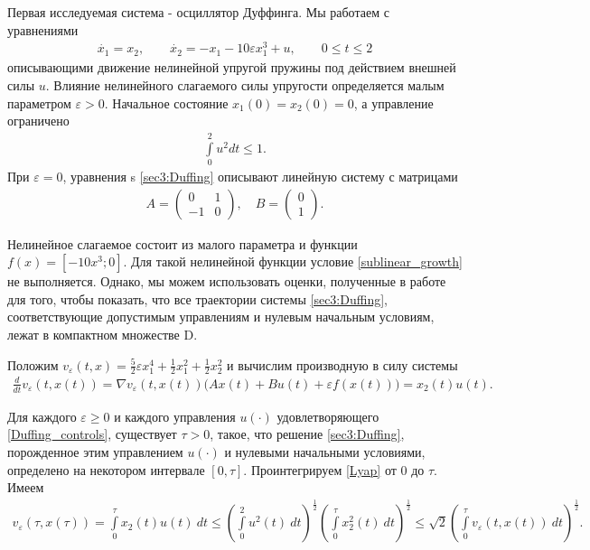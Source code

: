 \documentclass[../main.tex]{subfiles}
\begin{document}
\begin{pr}
	Первая исследуемая система - осциллятор Дуффинга. 
	Мы работаем с уравнениями
	\begin{gather}\label{sec3:Duffing}
		\dot{x_1} = x_2, \qquad
		\dot{x_2} = -x_1 - 10 \varepsilon x_1^3 + u ,\qquad 0\leqslant t  \leqslant 2
	\end{gather}
	описывающими движение нелинейной упругой пружины под действием внешней силы $u$. 
	Влияние нелинейного слагаемого силы упругости определяется малым параметром $\varepsilon > 0$. Начальное состояние $x_1(0) = x_2(0) = 0 $, а управление ограничено 
	\begin{gather}\label{Duffing_controls}
		\int\limits_0^2u^2dt \leqslant 1.
	\end{gather}
	При $\varepsilon = 0$, уравнения s \eqref{sec3:Duffing} описывают линейную систему с матрицами 
	\begin{gather*}
		A = \begin{pmatrix} 0 & 1\\
			-1 & 0
		\end{pmatrix}, \quad B = \begin{pmatrix}
			0\\
			1
		\end{pmatrix}.
	\end{gather*}
	
	Нелинейное слагаемое состоит из малого параметра и функции $f(x) = [-10x^3;0]$. 
	Для такой нелинейной функции условие  \eqref{sublinear_growth} не выполняется. 
	Однако, мы можем использовать оценки, полученные в работе  \cite{Zykov2019} для того, чтобы показать, что все траектории системы \eqref{sec3:Duffing}, соответствующие допустимым управлениям и нулевым начальным условиям, лежат в компактном множестве D. 
	
	Положим $v_{\varepsilon}(t,x) = \frac{5}{2}\varepsilon x_1^4 + \frac{1}{2}x_1^2 + \frac{1}{2}x_2^2$ и вычислим производную в силу системы 
	\begin{gather}\label{Lyap}
		\frac{d}{dt} v_{\varepsilon}(t,x(t)) = \nabla v_{\varepsilon}(t,x(t)) \big(A x(t) + B u(t) + \varepsilon f(x(t))\big) = x_2(t) u(t). 
	\end{gather} 
	
	Для каждого $\varepsilon \geqslant 0$ и каждого управления $u(\cdot)$ удовлетворяющего \eqref{Duffing_controls}, существует $\tau>0$, такое, что решение \eqref{sec3:Duffing}, порожденное этим управлением $u(\cdot)$ и нулевыми начальными условиями, определено на некотором интервале $[0, \tau]$. 
	Проинтегрируем \eqref{Lyap} от $0$ до $\tau$. 
	Имеем 
	\begin{gather*}
		v_{\varepsilon}(\tau,x(\tau)) =
		\int\limits_0^{\tau} x_2(t) u(t) \ dt 
		\leqslant 
		\left(\int\limits_0^2 u^2(t) \ dt \right)^{\frac{1}{2}} \left(\int\limits_0^{\tau} x_2^2(t) \ dt \right)^{\frac{1}{2}} \leqslant \sqrt{2} \left(\int\limits_0^{\tau} v_{\varepsilon}(t,x(t)) \ dt \right)^{\frac{1}{2}}.
	\end{gather*}
	

\end{pr}
\end{document}
